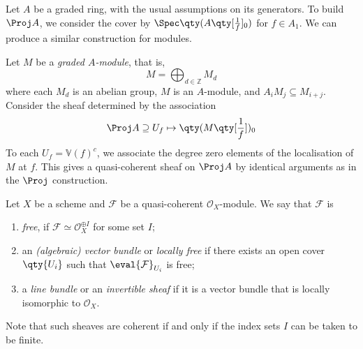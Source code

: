 Let \( A \) be a graded ring, with the usual assumptions on its generators.
To build \( \Proj A \), we consider the cover by \( \Spec \qty(A\qty[\frac{1}{f}]_0) \) for \( f \in A_1 \).
We can produce a similar construction for modules.

Let \( M \) be a \emph{graded \( A \)-module}, that is,
\[ M = \bigoplus_{d \in \mathbb Z} M_d \]
where each \( M_d \) is an abelian group, \( M \) is an \( A \)-module, and \( A_i M_j \subseteq M_{i+j} \).
Consider the sheaf determined by the association
\[ \Proj A \supseteq U_f \mapsto \qty(M\qty[\frac{1}{f}])_0 \]
To each \( U_f = \mathbb V(f)^c \), we associate the degree zero elements of the localisation of \( M \) at \( f \).
This gives a quasi-coherent sheaf on \( \Proj A \) by identical arguments as in the \( \Proj \) construction.
\begin{definition}
    Let \( X \) be a scheme and \( \mathcal F \) be a quasi-coherent \( \mathcal O_X \)-module.
    We say that \( \mathcal F \) is
    \begin{enumerate}
        \item \emph{free}, if \( \mathcal F \simeq \mathcal O_X^{\oplus I} \) for some set \( I \);
        \item an \emph{(algebraic) vector bundle} or \emph{locally free} if there exists an open cover \( \qty{U_i} \) such that \( \eval{\mathcal F}_{U_i} \) is free;
        \item a \emph{line bundle} or an \emph{invertible sheaf} if it is a vector bundle that is locally isomorphic to \( \mathcal O_X \).
    \end{enumerate}
\end{definition}
Note that such sheaves are coherent if and only if the index sets \( I \) can be taken to be finite.

